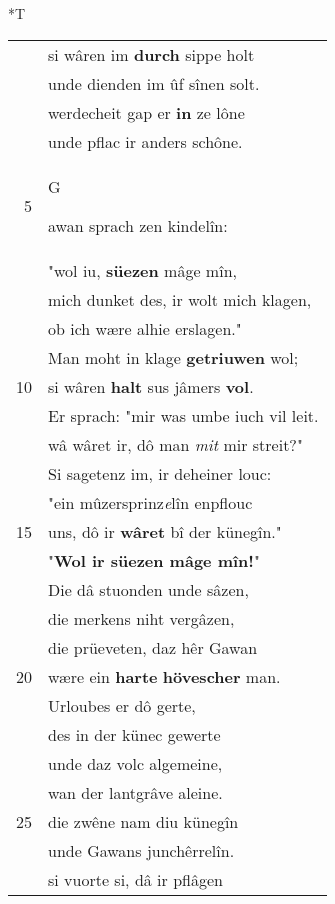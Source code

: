 \documentclass[8pt,a4paper,notitlepage]{article}
\begin{document}
\begin{table}[ht]
\begin{minipage}[t]{0.5\linewidth}
\end{minipage}
\hspace{0.5cm}
\begin{minipage}[t]{0.5\linewidth}
\small
\begin{center}*T
\end{center}
\begin{tabular}{rl}
 & si wâren im \textbf{durch} sippe holt\\ 
 & unde dienden im ûf sînen solt.\\ 
 & werdecheit gap er \textbf{in} ze lône\\ 
 & unde pflac ir anders schône.\\ 
5 & \begin{large}G\end{large}awan sprach zen kindelîn:\\ 
 & "wol iu, \textbf{süezen} mâge mîn,\\ 
 & mich dunket des, ir wolt mich klagen,\\ 
 & ob ich wære alhie erslagen."\\ 
 & Man moht in klage \textbf{getriuwen} wol;\\ 
10 & si wâren \textbf{halt} sus jâmers \textbf{vol}.\\ 
 & Er sprach: "mir was umbe iuch vil leit.\\ 
 & wâ wâret ir, dô man \textit{mit} mir streit?"\\ 
 & Si sagetenz im, ir deheiner louc:\\ 
 & "ein mûzersprinz\textit{e}lîn enpflouc\\ 
15 & uns, dô ir \textbf{wâret} bî der künegîn."\\ 
 & "\textbf{Wol ir süezen mâge mîn!}"\\ 
 & Die dâ stuonden unde sâzen,\\ 
 & die merkens niht vergâzen,\\ 
 & die  prüeveten, daz hêr Gawan\\ 
20 & wære ein \textbf{harte} \textbf{hövescher} man.\\ 
 & Urloubes er dô gerte,\\ 
 & des in der künec gewerte\\ 
 & unde daz volc algemeine,\\ 
 & wan der lantgrâve aleine.\\ 
25 & die zwêne nam diu künegîn\\ 
 & unde Gawans junchêrrelîn.\\ 
 & si vuorte si, dâ ir pflâgen\\ 

\end{tabular}
\end{minipage}
\end{table}
\end{document}
